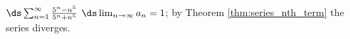 {$\ds \sum_{n=1}^\infty \frac{5^n-n^5}{5^n+n^5}$
}
{$\ds \lim_{n\to\infty}a_n = 1$; by Theorem \ref{thm:series_nth_term} the series diverges.
}